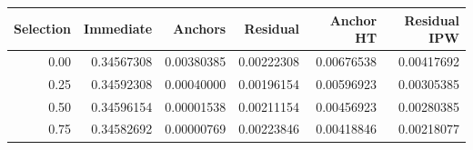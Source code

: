 \begin{center}\small
\begin{tabular}{rrrrrr}
\toprule
Selection & Immediate & Anchors & Residual & Anchor HT & Residual IPW \\
\midrule
0.00 & 0.34567308 & 0.00380385 & 0.00222308 & 0.00676538 & 0.00417692 \\
0.25 & 0.34592308 & 0.00040000 & 0.00196154 & 0.00596923 & 0.00305385 \\
0.50 & 0.34596154 & 0.00001538 & 0.00211154 & 0.00456923 & 0.00280385 \\
0.75 & 0.34582692 & 0.00000769 & 0.00223846 & 0.00418846 & 0.00218077 \\
\bottomrule
\end{tabular}
\end{center}
